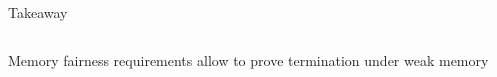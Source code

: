 \begin{frame}{Takeaway}
  

  \vspace{-0.5cm}
  
  \begin{columns}
    \begin{column}{0.4\linewidth}
      \begin{center}
        \scalebox{0.9}{\fairTrace}

        \vspace{0.8cm}
    
      \end{center}
    \end{column}    
    \begin{column}{0.4\linewidth}
      \renewcommand{\hof}{2}
      \renewcommand{\vof}{1}
      \scalebox{0.9}{
      \begin{tikzpicture}[xscale=2, yscale=0.9]
        \spinlockContraGraphEventsI
        \spinlockContraGraphRelationsI
        \spinlockContraGraphEventsII
        \spinlockContraGraphRelationsII
        \spinlockContraGraphContra
      \end{tikzpicture}
    }

    \end{column}    
  \end{columns}

  \vspace{0.5cm}
  \begin{center}
    Memory fairness requirements allow to prove termination under weak memory
  \end{center}


\end{frame}
